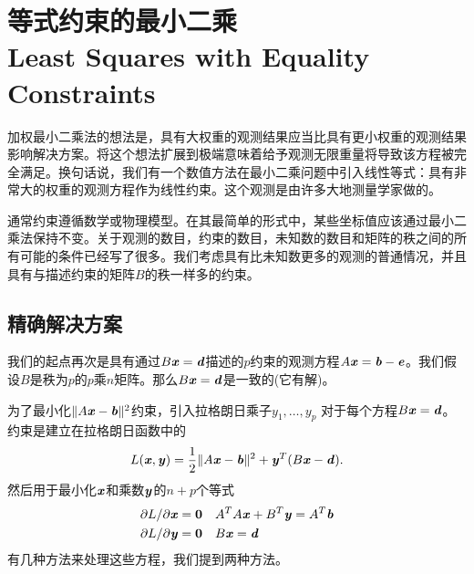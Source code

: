 \section[等式约束的最小二乘]{等式约束的最小二乘\\Least Squares with Equality Constraints}
加权最小二乘法的想法是，具有大权重的观测结果应当比具有更小权重的观测结果影响解决方案。将这个想法扩展到极端意味着给予观测无限重量将导致该方程被完全满足。换句话说，我们有一个数值方法在最小二乘问题中引入线性等式：具有非常大的权重的观测方程作为线性约束。这个观测是由许多大地测量学家做的。

通常约束遵循数学或物理模型。在其最简单的形式中，某些坐标值应该通过最小二乘法保持不变。关于观测的数目，约束的数目，未知数的数目和矩阵的秩之间的所有可能的条件已经写了很多。我们考虑具有比未知数更多的观测的普通情况，并且具有与描述约束的矩阵$B$的秩一样多的约束。

\subsection{精确解决方案}

我们的起点再次是具有通过$B\textbf{\textit{x}}=\textbf{\textit{d}}$描述的$p$约束的观测方程$A\textbf{\textit{x}}=\textbf{\textit{b}}-\textbf{\textit{e}}$。我们假设$B$是秩为$p$的$p$乘$n$矩阵。那么$B\textbf{\textit{x}}=\textbf{\textit{d}}$是一致的(它有解)。

为了最小化$ \lVert A\textbf{\textit{x}}-\textbf{\textit{b}} \rVert^{2}$约束，引入拉格朗日乘子$y_{1},\ldots,y_{p}$
对于每个方程$B\textbf{\textit{x}}=\textbf{\textit{d}}$。约束是建立在拉格朗日函数中的
\begin{align}
L(\textbf{\textit{x}},\textbf{\textit{y}}) = \dfrac{1}{2} \lVert A\textbf{\textit{x}}-\textbf{\textit{b}} \rVert^{2} + \textbf{\textit{y}}^{T}(B\textbf{\textit{x}}-\textbf{\textit{d}}).
\end{align}
然后用于最小化$\textbf{\textit{x}}$和乘数$\textbf{\textit{y}}$的$n+p$个等式
\begin{align*}
\partial L/ \partial \textbf{\textit{x}} &= \textbf{0}  & &
A^{T}A\textbf{\textit{x}} + B^{T}\textbf{\textit{y}} = A^{T}\textbf{\textit{b}} \\
\partial L/ \partial \textbf{\textit{y}} &= \textbf{0}  & & 
B\textbf{\textit{x}}  = \textbf{\textit{d}} 	
\end{align*}
有几种方法来处理这些方程，我们提到两种方法。

